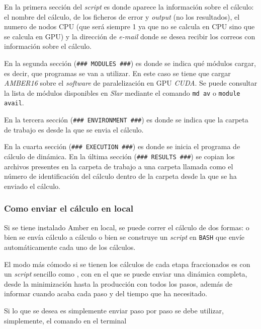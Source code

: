             En la primera sección del \textit{script} es donde aparece la información sobre el cálculo: el nombre del cálculo, de los ficheros de error y \textit{output} (no los resultados), el numero de nodos CPU (que será siempre 1 ya que no se calcula en CPU sino que se calcula en GPU) y la dirección de \textit{e-mail} donde se desea recibir los correos con información sobre el cálculo.\par
            En la segunda sección (\texttt{\#\#\# MODULES \#\#\#}) es donde se indica qué módulos cargar, es decir, que programas se van a utilizar. En este caso se tiene que cargar \textit{AMBER16} sobre el \textit{software} de paralelización en GPU \textit{CUDA}. Se puede consultar la lista de módulos disponibles en \textit{Slar} mediante el comando \texttt{md av} o \texttt{module avail}.\par
            En la tercera sección (\texttt{\#\#\# ENVIRONMENT \#\#\#}) es donde se indica que la carpeta de trabajo es desde la que se envia el cálculo.\par
            En la cuarta sección (\texttt{\#\#\# EXECUTION \#\#\#}) es donde se inicia el programa de cálculo de dinámica. 
            En la última sección (\texttt{\#\#\# RESULTS \#\#\#}) se copian los archivos presentes en la carpeta de trabajo a una carpeta llamada como el número de identificación del cálculo dentro de la carpeta desde la que se ha enviado el cálculo.
            
        \subsubsection{Como enviar el cálculo en local}
            Si se tiene instalado Amber en local, se puede correr el cálculo de dos formas: o bien se envía cálculo a cálculo o bien se construye un \textit{script} en \texttt{BASH} que envíe automáticamente cada uno de los cálculos. \par 
            El modo más cómodo si se tienen los cálculos de cada etapa fraccionados es con un \textit{script} sencillo como , con en el que se puede enviar una dinámica completa, desde la minimización hasta la producción con todos los pasos, además de informar cuando acaba cada paso y del tiempo que ha necesitado. \par
            Si lo que se desea es simplemente enviar paso por paso se debe utilizar, simplemente, el comando en el terminal
            
            
            
